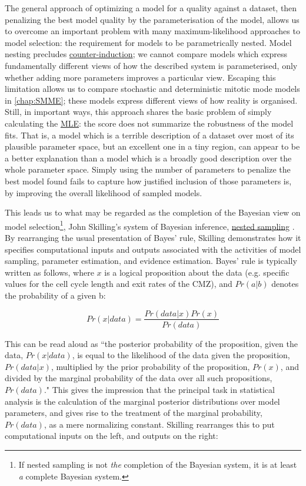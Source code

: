 \documentclass{ut-thesis}
\begin{document}
\begin{NoHyper}
The general approach of optimizing a model for a quality against a dataset, then penalizing the best model quality by the parameterisation of the model, allows us to overcome an important problem with many maximum-likelihood approaches to model selection: the requirement for models to be parametrically nested. Model nesting precludes \hyperref[sec:Feyerabend]{counter-induction}; we cannot compare models which express fundamentally different views of how the described system is parameterised, only whether adding more parameters improves a particular view. Escaping this limitation allows us to compare stochastic and deterministic mitotic mode models in \autoref{chap:SMME}; these models express different views of how reality is organised. Still, in important ways, this approach shares the basic problem of simply calculating the \hyperref[ssec:MLE]{MLE}: the score does not summarize the robustness of the model fits. That is, a model which is a terrible description of a dataset over most of its plausible parameter space, but an excellent one in a tiny region, can appear to be a better explanation than a model which is a broadly good description over the whole parameter space. Simply using the number of parameters to penalize the best model found fails to capture how justified inclusion of those parameters is, by improving the overall likelihood of sampled models.

This leads us to what may be regarded as the completion of the Bayesian view on model selection\footnote{If nested sampling is not \textit{the} completion of the Bayesian system, it is at least \textit{a} complete Bayesian system.}, John Skilling's system of Bayesian inference, \hyperref[ssec:nested]{nested sampling} \cite{Skilling2006,Skilling2012,Skilling2019}. By rearranging the usual presentation of Bayes' rule, Skilling demonstrates how it specifies computational inputs and outputs associated with the activities of model sampling, parameter estimation, and evidence estimation. Bayes' rule is typically written as follows, where $x$ is a logical proposition about the data (e.g. specific values for the cell cycle length and exit rates of the CMZ), and $Pr(a|b)$ denotes the probability of a given b:

\[Pr(x|data) = \frac{Pr(data|x)Pr(x)}{Pr(data)}\]

This can be read aloud as ``the posterior probability of the proposition, given the data, $Pr(x|data)$, is equal to the likelihood of the data given the proposition, $Pr(data|x)$, multiplied by the prior probability of the proposition, $Pr(x)$, and divided by the marginal probability of the data over all such propositions, $Pr(data)$." This gives the impression that the principal task in statistical analysis is the calculation of the marginal posterior distributions over model parameters, and gives rise to the treatment of the marginal probability, $Pr(data)$, as a mere normalizing constant. Skilling rearranges this to put computational inputs on the left, and outputs on the right:


\end{NoHyper}
\end{document}
